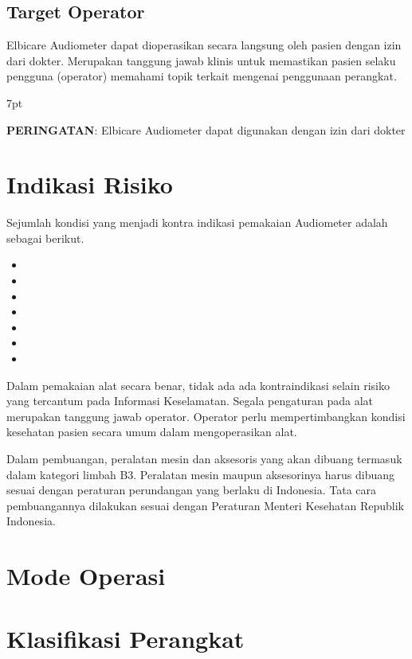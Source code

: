 \documentclass[11pt,a4paper,twoside,draft,onecolumn]{book}
\newenvironment{formalred}{%
	\def\FrameCommand{%
		\hspace{1pt}%
		{\color{red}\vrule width 2pt}%
		{\color{formalshade}\vrule width 4pt}%
		\colorbox{formalshade}%
	}%
	\MakeFramed{\advance\hsize-\width\FrameRestore}%
	\noindent\hspace{-4.55pt}%
	\begin{adjustwidth}{}{7pt}%
		\vspace{2pt}\vspace{2pt}%
	}
	{%
		\vspace{2pt}\end{adjustwidth}\endMakeFramed%
}
\begin{document}
			\subsection{Target Operator}
			Elbicare Audiometer dapat dioperasikan secara langsung oleh pasien dengan izin dari dokter. Merupakan tanggung jawab klinis untuk memastikan pasien selaku pengguna (operator) memahami topik terkait mengenai penggunaan perangkat.
			\begin{formalred}
				\raisebox{0.125ex}{\resizebox{!}{2ex}{\danger}} \textbf{PERINGATAN}: 
				Elbicare Audiometer dapat digunakan dengan izin dari dokter
			\end{formalred}	
		
		\section{Indikasi Risiko}
		Sejumlah kondisi yang menjadi kontra indikasi pemakaian Audiometer adalah sebagai berikut.
		\begin{itemize}
			\item 
			\item 
			\item 
			\item 
			\item 
			\item 
			\item 
		\end{itemize}
	
		Dalam pemakaian alat secara benar, tidak ada ada kontraindikasi selain risiko yang tercantum pada Informasi Keselamatan. Segala pengaturan pada alat merupakan tanggung jawab operator. Operator perlu mempertimbangkan kondisi kesehatan pasien secara umum dalam mengoperasikan alat.
		
		Dalam pembuangan, peralatan mesin dan aksesoris yang akan dibuang termasuk dalam kategori limbah B3. Peralatan mesin maupun aksesorinya harus dibuang sesuai dengan peraturan perundangan yang berlaku di Indonesia. Tata cara pembuangannya dilakukan sesuai dengan Peraturan Menteri Kesehatan Republik Indonesia.
		
		\section{Mode Operasi}
		
		\section{Klasifikasi Perangkat}
		
\end{document}
